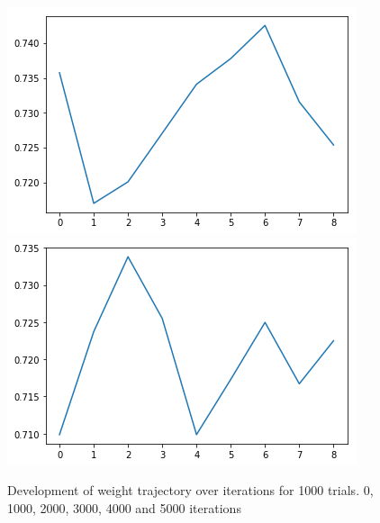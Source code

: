 \begin{figure}[hbt!]
    \includegraphics[scale = 0.3]{fig/4000_it_1000.png}
    \includegraphics[scale = 0.3]{fig/5000_it_1000.png}
    \caption{Development of weight trajectory over iterations for 1000 trials. 0, 1000, 2000, 3000, 4000 and 5000 iterations}
    \label{w_trajectory_1000}
\end{figure}

